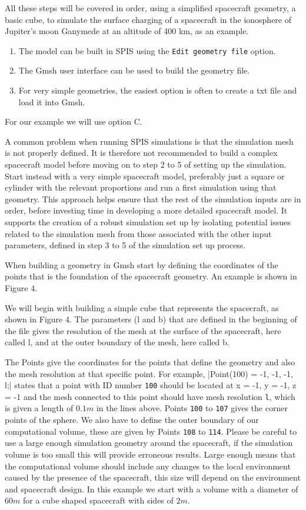 \documentclass[a4paper, 11pt]{article}
\begin{document}
All these steps will be covered in order, using a simplified spacecraft geometry, a basic cube, to simulate the surface charging of a spacecraft in the ionosphere of Jupiter's moon Ganymede at an altitude of 400 km, as an example.
\begin{enumerate}[label=\Alph*.]
    \item The model can be built in SPIS using the \verb|Edit geometry file| option.
    \item The Gmsh user interface can be used to build the geometry file.
    \item For very simple geometries, the easiest option is often to create a txt file and load it into Gmsh.
\end{enumerate}
For our example we will use option C.\par
A common problem when running SPIS simulations is that the simulation mesh is not properly defined. It is therefore not recommended to build a complex spacecraft model before moving on to step 2 to 5 of setting up the simulation. Start instead with a very simple spacecraft model, preferably just a square or cylinder with the relevant proportions and run a first simulation using that geometry. This approach helps ensure that the rest of the simulation inputs are in order, before investing time in developing a more detailed spacecraft model. It supports the creation of a robust  simulation set up by isolating potential issues related to the simulation mesh from those associated with the other input parameters, defined in step 3 to 5 of the simulation set up process.\par
When building a geometry in Gmsh start by defining the coordinates of the points that is the foundation of the spacecraft geometry. An example is shown in Figure 4.\par
We will begin with building a simple cube that represents the spacecraft, as shown in Figure 4. The parameters (l and b) that are defined in the beginning of the file gives the resolution of the mesh at the surface of the spacecraft, here called l, and at the outer boundary of the mesh, here called b.\par
The Points give the coordinates for the points that define the geometry and also the mesh resolution at that specific point. For example, |Point(100) = {-1, -1, -1, l};| states that a point with ID number \verb|100| should be located at x = -1, y = -1, z = -1 and the mesh connected to this point should have mesh resolution \verb|l|, which is given a length of $0.1 \si{m}$ in the lines above. Points \verb|100| to \verb|107| gives the corner points of the sphere. We also have to define the outer boundary of our computational volume, these are given by Points \verb|108| to \verb|114|. Please be careful to use a large enough simulation geometry around the spacecraft, if the simulation volume is too small this will provide erroneous results. Large enough means that the computational volume should include any changes to the local environment caused by the presence of the spacecraft, this size will depend on the environment and spacecraft design. In this example we start with a volume with a diameter of $60 \si{m}$ for a cube shaped spacecraft with sides of $2 \si{m}$.
\end{document}
